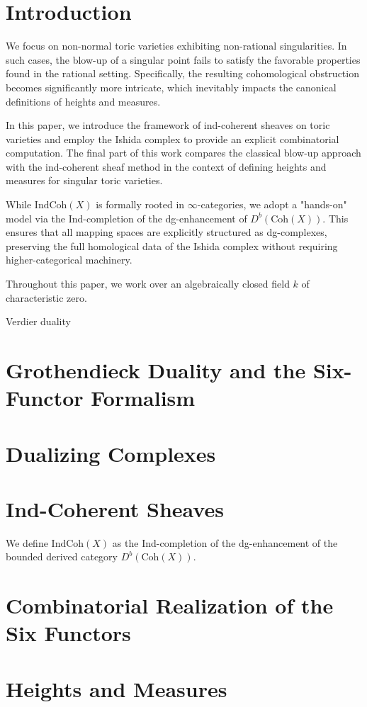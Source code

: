 {\begingroup
\newcommand{\rep}{\operatorname{rep}}
\newcommand{\icoh}{\operatorname{IndCoh}}
\newcommand{\qcoh}{\operatorname{QCoh}}
\newcommand{\coh}{\operatorname{Coh}}
\newcommand{\dmod}{\operatorname{D-mod}}
\newcommand{\g}{\mathfrak{g}}
\newcommand{\ug}{U(\mathfrak{g})}
\newcommand{\gmod}{\mathfrak{g}\text{-mod}}
\newcommand{\dr}{\text{dR}}
\newcommand{\spec}{\operatorname{Spec}}

\section{Introduction}


We focus on non-normal toric varieties exhibiting non-rational singularities. 
In such cases, the blow-up of a singular point fails to satisfy the favorable properties found in the rational setting. 
Specifically, the resulting cohomological obstruction becomes significantly more intricate, which inevitably impacts the canonical definitions of heights and measures.

In this paper, we introduce the framework of ind-coherent sheaves on toric varieties and employ the Ishida complex to provide an explicit combinatorial computation. 
The final part of this work compares the classical blow-up approach with the ind-coherent sheaf method in the context of defining heights and measures for singular toric varieties.

While $\mathrm{IndCoh}(X)$ is formally rooted in $\infty$-categories, we adopt a "hands-on" model via the Ind-completion of the dg-enhancement of $D^b(\mathrm{Coh}(X))$. 
This ensures that all mapping spaces are explicitly structured as dg-complexes, preserving the full homological data of the Ishida complex without requiring higher-categorical machinery.

Throughout this paper, we work over an algebraically closed field $k$ of characteristic zero.

Verdier duality

\section{Grothendieck Duality and the Six-Functor Formalism}

\section{Dualizing Complexes}

\section{Ind-Coherent Sheaves}
We define $\mathrm{IndCoh}(X)$ as the Ind-completion of the dg-enhancement of the bounded derived category $D^b(\mathrm{Coh}(X))$.
\section{Combinatorial Realization of the Six Functors}

\section{Heights and Measures}


\endgroup}